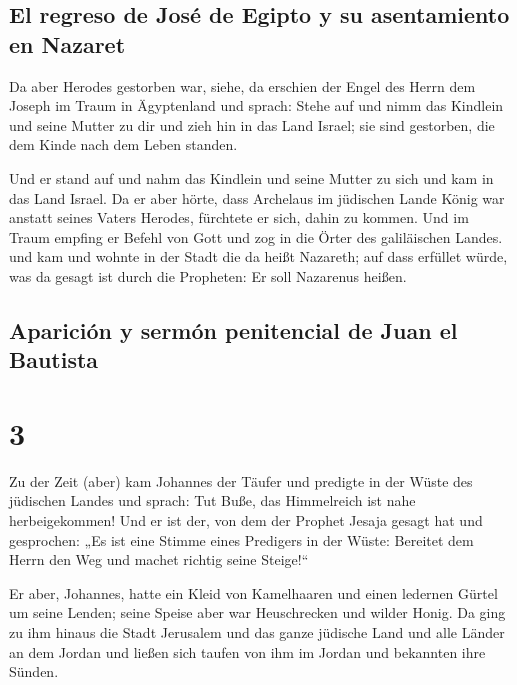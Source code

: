 \hypertarget{el-regreso-de-josuxe9-de-egipto-y-su-asentamiento-en-nazaret}{%
\subsection{El regreso de José de Egipto y su asentamiento en
Nazaret}\label{el-regreso-de-josuxe9-de-egipto-y-su-asentamiento-en-nazaret}}

 Da aber Herodes gestorben war, siehe, da erschien der
Engel des Herrn dem Joseph im Traum in Ägyptenland  und
sprach: Stehe auf und nimm das Kindlein und seine Mutter zu dir und zieh
hin in das Land Israel; sie sind gestorben, die dem Kinde nach dem Leben
standen.

 Und er stand auf und nahm das Kindlein und seine Mutter
zu sich und kam in das Land Israel.  Da er aber hörte,
dass Archelaus im jüdischen Lande König war anstatt seines Vaters
Herodes, fürchtete er sich, dahin zu kommen. Und im Traum empfing er
Befehl von Gott und zog in die Örter des galiläischen Landes.
 und kam und wohnte in der Stadt die da heißt Nazareth;
auf dass erfüllet würde, was da gesagt ist durch die Propheten: Er soll
Nazarenus heißen.

\hypertarget{apariciuxf3n-y-sermuxf3n-penitencial-de-juan-el-bautista}{%
\subsection{Aparición y sermón penitencial de Juan el
Bautista}\label{apariciuxf3n-y-sermuxf3n-penitencial-de-juan-el-bautista}}

\hypertarget{section-2}{%
\section{3}\label{section-2}}

 Zu der Zeit (aber) kam Johannes der Täufer und predigte
in der Wüste des jüdischen Landes  und sprach: Tut Buße,
das Himmelreich ist nahe herbeigekommen!  Und er ist der,
von dem der Prophet Jesaja gesagt hat und gesprochen: „Es ist eine
Stimme eines Predigers in der Wüste: Bereitet dem Herrn den Weg und
machet richtig seine Steige!{}``

 Er aber, Johannes, hatte ein Kleid von Kamelhaaren und
einen ledernen Gürtel um seine Lenden; seine Speise aber war
Heuschrecken und wilder Honig.  Da ging zu ihm hinaus die
Stadt Jerusalem und das ganze jüdische Land und alle Länder an dem
Jordan  und ließen sich taufen von ihm im Jordan und
bekannten ihre Sünden.

